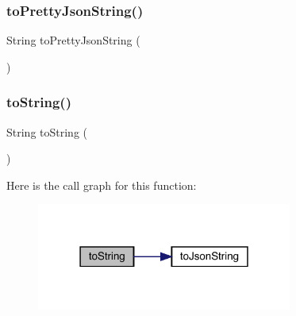 \subsubsection{\texorpdfstring{to\+Pretty\+Json\+String()}{toPrettyJsonString()}}
{\footnotesize\ttfamily String to\+Pretty\+Json\+String (\begin{DoxyParamCaption}{ }\end{DoxyParamCaption})\hspace{0.3cm}{\ttfamily [inherited]}}

\mbox{\label{classcom_1_1toast_1_1android_1_1gamebase_1_1base_1_1_value_object_ad146fa8579a5f8a876c4688cc5a68520}} 
\subsubsection{\texorpdfstring{to\+String()}{toString()}}
{\footnotesize\ttfamily String to\+String (\begin{DoxyParamCaption}{ }\end{DoxyParamCaption})\hspace{0.3cm}{\ttfamily [inherited]}}

Here is the call graph for this function\+:
\nopagebreak
\begin{figure}[H]
\begin{center}
\leavevmode
\includegraphics[width=238pt]{classcom_1_1toast_1_1android_1_1gamebase_1_1base_1_1_value_object_ad146fa8579a5f8a876c4688cc5a68520_cgraph}
\end{center}
\end{figure}


